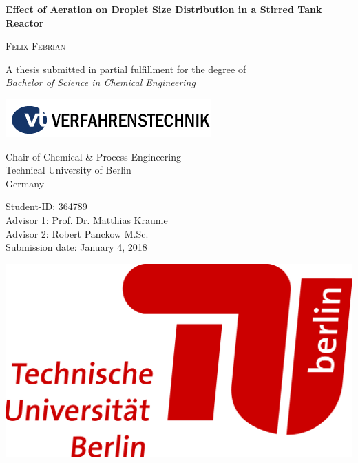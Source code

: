\begin{titlepage}
\thispagestyle{empty}

\begin{center}
	\LARGE
	\textsf{\textbf{Effect of Aeration on Droplet Size Distribution in a Stirred Tank Reactor}} \\
    \vspace{2cm}
        
    \large
    \textsc{Felix Febrian}
	\vspace{5cm}

	\large
	A thesis submitted in partial fulfillment for the degree of \\
    \textit{Bachelor of Science in Chemical Engineering}
        
	\vspace{2cm}	
	\includegraphics[scale=1]{pictures/vt_logo.png}
 
	Chair of Chemical \& Process Engineering \\
	Technical University of Berlin \\
    Germany
\end{center}

\normalsize
\vfill
\noindent   \begin{minipage}{0.6\textwidth} %
Student-ID:			\tabto{4.0cm} 364789	\\
Advisor 1:			\tabto{4.0cm} Prof. Dr. Matthias Kraume \\
Advisor 2:			\tabto{4.0cm} Robert Panckow M.Sc. \\
Submission date:		\tabto{4.0cm} January 4, 2018
\end{minipage}
\begin{minipage}{0.3\textwidth}
    \hfill \includegraphics[scale=0.5]{pictures/TU_Logo_lang_4c_rot.png}
\end{minipage}

\end{titlepage}


